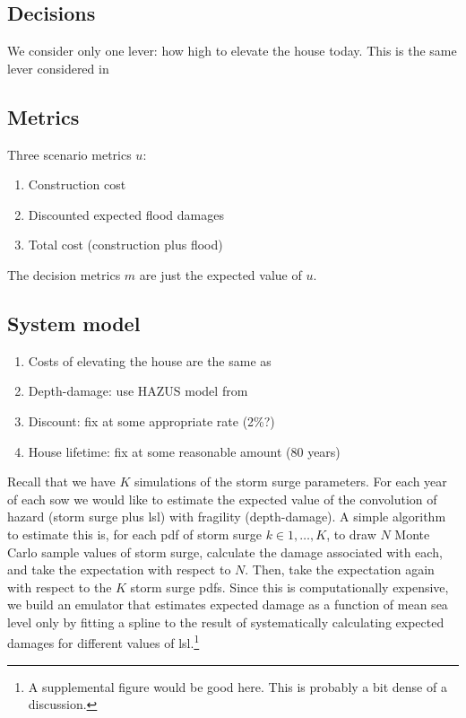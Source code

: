 \documentclass[12pt]{article}
\begin{document}
\subsection{Decisions}

We consider only one lever: how high to elevate the house today.
This is the same lever considered in \citet{zarekarizi_suboptimal:2020}

\subsection{Metrics}

Three scenario metrics $u$:
\begin{enumerate}
    \item Construction cost
    \item Discounted expected flood damages
    \item Total cost (construction plus flood)
\end{enumerate}
The decision metrics $m$ are just the expected value of $u$.

\subsection{System model}

\begin{enumerate}
    \item Costs of elevating the house are the same as \citet{zarekarizi_suboptimal:2020}
    \item Depth-damage: use HAZUS model from \citet{zarekarizi_suboptimal:2020}
    \item Discount: fix at some appropriate rate (2\%?)
    \item House lifetime: fix at some reasonable amount (80 years)
\end{enumerate}

Recall that we have $K$ simulations of the storm surge parameters.
For each year of each \gls{sow} we would like to estimate the expected value of the convolution of hazard (storm surge plus \gls{lsl}) with fragility (depth-damage).
A simple algorithm to estimate this is, for each \gls{pdf} of storm surge $k \in 1, \ldots, K$, to draw $N$ Monte Carlo sample values of storm surge, calculate the damage associated with each, and take the expectation with respect to $N$.
Then, take the expectation again with respect to the $K$ storm surge \glspl{pdf}.
Since this is computationally expensive, we build an emulator that estimates expected damage as a function of mean sea level only by fitting a spline to the result of systematically calculating expected damages for different values of \gls{lsl}.\footnote{A supplemental figure would be good here. This is probably a bit dense of a discussion.}
\end{document}

